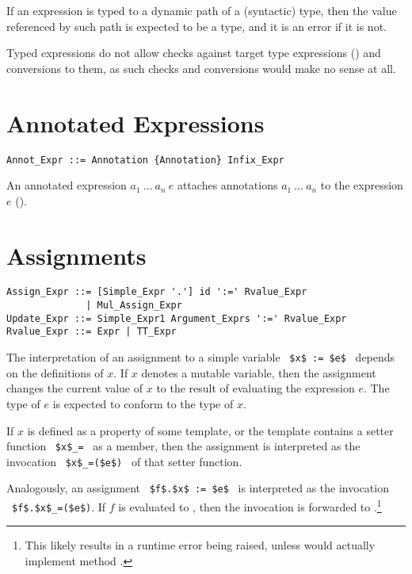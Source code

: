 If an expression is typed to a dynamic path of a (syntactic) type, then the value referenced by such path is expected to be a type, and it is an error if it is not. 

Typed expressions do not allow checks against target type expressions () and conversions to them, as such checks and conversions would make no sense at all. 






\section{Annotated Expressions}
\label{sec:annotated-exprs}

\syntax\begin{lstlisting}
Annot_Expr ::= Annotation {Annotation} Infix_Expr
\end{lstlisting}

An annotated expression $a_1\ \ldots\ a_n\ e$ attaches annotations $a_1\ \ldots\ a_n$ to the expression $e$ (). 






\section{Assignments}

\syntax\begin{lstlisting}
Assign_Expr ::= [Simple_Expr '.'] id ':=' Rvalue_Expr
              | Mul_Assign_Expr
Update_Expr ::= Simple_Expr1 Argument_Exprs ':=' Rvalue_Expr
Rvalue_Expr ::= Expr | TT_Expr
\end{lstlisting}

The interpretation of an assignment to a simple variable ~\lstinline!$x$ := $e$!~ depends on the definitions of $x$. If $x$ denotes a mutable variable, then the assignment changes the current value of $x$ to the result of evaluating the expression $e$. The type of $e$ is expected to conform to the type of $x$. 

If $x$ is defined as a property of some template, or the template contains a setter function ~\lstinline!$x$_=!~ as a member, then the assignment is interpreted as the invocation ~\lstinline!$x$_=($e$)!~ of that setter function. 

Analogously, an assignment ~\lstinline!$f$.$x$ := $e$!~ is interpreted as the invocation ~\lstinline!$f$.$x$_=($e$)!. If $f$ is evaluated to , then the invocation is forwarded to .\footnote{This likely results in a runtime error being raised, unless  would actually implement method .} 

